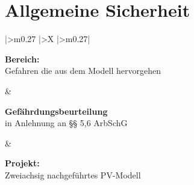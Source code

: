 \chapter{Allgemeine Sicherheit}\label{ch:gefahrdungsbeurteilung}

\begin{table}[H]
    \centering
    \renewcommand{\arraystretch}{1.5}

    \begin{tabularx}{\textwidth}{
        |>{\centering\arraybackslash}m{0.27\textwidth}
        |>{\centering\arraybackslash}X
        |>{\centering\arraybackslash}m{0.27\textwidth}|}
        \hline

        \begin{minipage}[c][3.0cm][c]{\linewidth}
            \centering
            \textbf{Bereich:}\\[0.6em]
            Gefahren die aus dem Modell hervorgehen
        \end{minipage}
        &
        \begin{minipage}[c][3.0cm][c]{\linewidth}
            \centering
            \Large\textbf{Gefährdungsbeurteilung}\\
            in Anlehnung an §§ 5,6 ArbSchG
        \end{minipage}
        &
        \begin{minipage}[c][3.0cm][c]{\linewidth}
            \centering
            \textbf{Projekt:}\\[0.6em]
            Zweiachsig nachgeführtes PV-Modell
        \end{minipage}
        \\

        \hline
    \end{tabularx}\label{tab:table}
\end{table}

